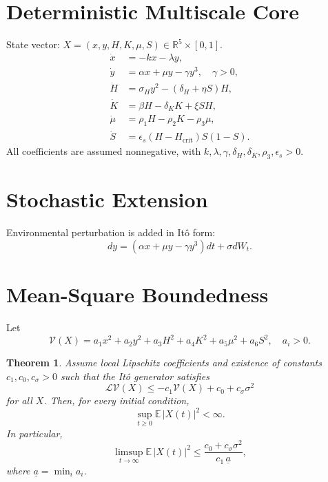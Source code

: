 ﻿\documentclass[12pt,a4paper]{article}
\newtheorem{theorem}{Theorem}
\begin{document}
\section{Deterministic Multiscale Core}
State vector: $X=(x,y,H,K,\mu,S)\in\mathbb{R}^5\times[0,1]$.
\begin{align}
\dot x &= -k x-\lambda y, \\
\dot y &= \alpha x+\mu y-\gamma y^3, \quad \gamma>0, \\
\dot H &= \sigma_H y^2-(\delta_H+\eta S)H, \\
\dot K &= \beta H-\delta_K K+\xi SH, \\
\dot\mu &= \rho_1 H-\rho_2 K-\rho_3\mu, \\
\dot S &= \epsilon_s(H-H_{\mathrm{crit}})S(1-S).
\end{align}
All coefficients are assumed nonnegative, with
$k,\lambda,\gamma,\delta_H,\delta_K,\rho_3,\epsilon_s>0$.

\section{Stochastic Extension}
Environmental perturbation is added in It\^o form:
\begin{equation}
dy=(\alpha x+\mu y-\gamma y^3)dt+\sigma dW_t.
\end{equation}

\section{Mean-Square Boundedness}
Let
\begin{equation}
\mathcal V(X)=a_1x^2+a_2y^2+a_3H^2+a_4K^2+a_5\mu^2+a_6S^2,
\quad a_i>0.
\end{equation}

\begin{theorem}
Assume local Lipschitz coefficients and existence of constants $c_1,c_0,c_\sigma>0$ such that the It\^o generator satisfies
\begin{equation}
\mathcal L\mathcal V(X)\le -c_1\mathcal V(X)+c_0+c_\sigma\sigma^2
\end{equation}
for all $X$. Then, for every initial condition,
\begin{equation}
\sup_{t \ge 0}\mathbb E\,|X(t)|^2<\infty.
\end{equation}
In particular,
\begin{equation}
\limsup_{t\to\infty}\mathbb E\,|X(t)|^2\le \frac{c_0+c_\sigma\sigma^2}{c_1\,\underline a},
\end{equation}
where $\underline a=\min_i a_i$.
\end{theorem}
\end{document}
